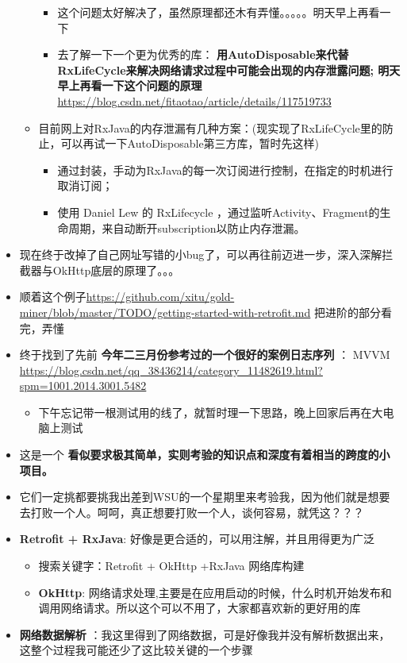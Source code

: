 \documentclass[9pt, b5paper]{article}
\begin{document}
\begin{itemize}
\begin{itemize}
\begin{itemize}
\item 这个问题太好解决了，虽然原理都还木有弄懂。。。。。明天早上再看一下
\item 去了解一下一个更为优秀的库： \textbf{用AutoDisposable来代替RxLifeCycle来解决网络请求过程中可能会出现的内存泄露问题; 明天早上再看一下这个问题的原理} \url{https://blog.csdn.net/fitaotao/article/details/117519733}
\end{itemize}
\item 目前网上对RxJava的内存泄漏有几种方案：(现实现了RxLifeCycle里的防止，可以再试一下AutoDisposable第三方库，暂时先这样)
\begin{itemize}
\item 通过封装，手动为RxJava的每一次订阅进行控制，在指定的时机进行取消订阅；
\item 使用 Daniel Lew 的 RxLifecycle ，通过监听Activity、Fragment的生命周期，来自动断开subscription以防止内存泄漏。
\end{itemize}
\end{itemize}
\item 现在终于改掉了自己网址写错的小bug了，可以再往前迈进一步，深入深解拦截器与OkHttp底层的原理了。。。
\item 顺着这个例子\url{https://github.com/xitu/gold-miner/blob/master/TODO/getting-started-with-retrofit.md} 把进阶的部分看完，弄懂
\item 终于找到了先前 \textbf{今年二三月份参考过的一个很好的案例日志序列} ： MVVM \url{https://blog.csdn.net/qq_38436214/category_11482619.html?spm=1001.2014.3001.5482}
\begin{itemize}
\item 下午忘记带一根测试用的线了，就暂时理一下思路，晚上回家后再在大电脑上测试
\end{itemize}
\item 这是一个 \textbf{看似要求极其简单，实则考验的知识点和深度有着相当的跨度的小项目。}
\item 它们一定挑都要挑我出差到WSU的一个星期里来考验我，因为他们就是想要去打败一个人。呵呵，真正想要打败一个人，谈何容易，就凭这？？？
\item \textbf{Retrofit + RxJava}: 好像是更合适的，可以用注解，并且用得更为广泛
\begin{itemize}
\item 搜索关键字：Retrofit + OkHttp +RxJava 网络库构建
\item \textbf{OkHttp}: 网络请求处理,主要是在应用启动的时候，什么时机开始发布和调用网络请求。所以这个可以不用了，大家都喜欢新的更好用的库
\end{itemize}
\item \textbf{网络数据解析} ：我这里得到了网络数据，可是好像我并没有解析数据出来，这整个过程我可能还少了这比较关键的一个步骤

\end{itemize}
\end{document}
